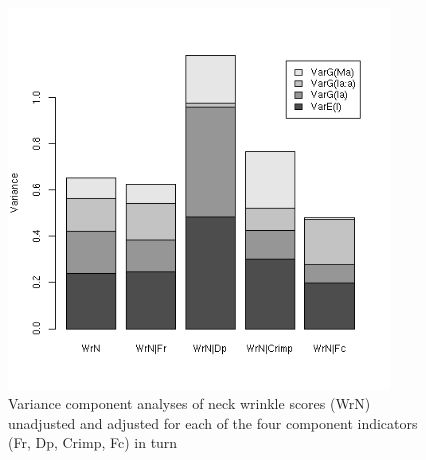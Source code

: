 %

\begin{figure}[!h]
  \centering
   \includegraphics[width=0.9\textwidth]{wrncov.png}
  \caption{Variance component analyses of neck wrinkle scores (WrN)  unadjusted and adjusted for each of the four component indicators (Fr, Dp, Crimp, Fc) in turn}
  \label{fig:wrncov}
\end{figure}

%

